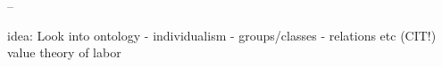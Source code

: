 




--

idea:
Look into ontology
- individualism
- groups/classes
- relations etc
(CIT!)
value theory of labor
